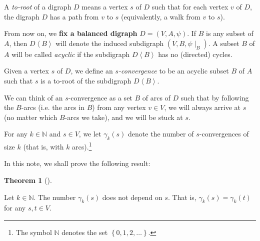 \documentclass[numbers=enddot,12pt,final,onecolumn,notitlepage]{scrartcl}%
\theoremstyle{definition}
\newtheorem{theo}{Theorem}[section]
\newenvironment{theorem}[1][]
{\begin{theo}[#1]\begin{leftbar}}
{\end{leftbar}\end{theo}}
\theoremstyle{plainsl}
\begin{document}
A \emph{to-root} of a digraph $D$ means a vertex $s$ of $D$ such that for each
vertex $v$ of $D$, the digraph $D$ has a path from $v$ to $s$ (equivalently, a
walk from $v$ to $s$).

From now on, we \textbf{fix a balanced digraph} $D = (V,A,\psi)$. If $B$ is
any subset of $A$, then $D \left\langle B \right\rangle $ will denote the
induced subdigraph $\left(  V,B,\psi\mid_{B}\right)  $. A subset $B$ of $A$
will be called \emph{acyclic} if the subdigraph $D \left\langle B
\right\rangle $ has no (directed) cycles.

Given a vertex $s$ of $D$, we define an \emph{$s$-convergence} to be an
acyclic subset $B$ of $A$ such that $s$ is a to-root of the subdigraph $D
\left\langle B \right\rangle $.

We can think of an $s$-convergence as a set $B$ of arcs of $D$ such that by
following the $B$-arcs (i.e. the arcs in $B$) from any vertex $v \in V$, we
will always arrive at $s$ (no matter which $B$-arcs we take), and we will be
stuck at $s$.

For any $k\in\mathbb{N}$ and $s\in V$, we let $\gamma_{k}\left(  s\right)  $
denote the number of $s$-convergences of size $k$ (that is, with $k$
arcs).\footnote{The symbol $\mathbb{N}$ denotes the set $\left\{
0,1,2,\ldots\right\}  $.}

In this note, we shall prove the following result:

\begin{theorem}
\label{thm.balgamma}Let $k\in\mathbb{N}$. The number $\gamma_{k}\left(
s\right)  $ does not depend on $s$. That is, $\gamma_{k}\left(  s\right)
=\gamma_{k}\left(  t\right)  $ for any $s,t\in V$.
\end{theorem}
\end{document}
